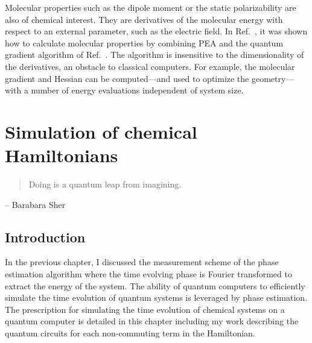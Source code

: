 \documentclass[11pt,oneside,final]{huthesis}%
\begin{document}
Molecular properties such as the dipole moment or the static polarizability are
also of chemical interest. They are derivatives of the molecular energy with
respect to an external parameter, such as the electric field. In Ref.~\cite{Kassal09},
it was shown how to
calculate molecular properties by combining PEA and the quantum gradient
algorithm of Ref.~\cite{Jordan05}. The algorithm is insensitive to the dimensionality
of the derivatives, an obstacle to classical computers. For example, the
molecular gradient and Hessian can be computed---and used to optimize the
geometry---with a number of energy evaluations independent of system size.




\chapter{Simulation of chemical Hamiltonians}\label{chp:qsim}    
\begin{quote}
Doing is a quantum leap from imagining.
\end{quote}
-- Barabara Sher

\section{Introduction}


In the previous chapter, I discussed the measurement scheme of the phase estimation algorithm where the time evolving phase is Fourier transformed to extract the energy of the system.  The ability of quantum computers to efficiently simulate the time evolution of quantum systems is leveraged by phase estimation.  The prescription for simulating the time evolution of chemical systems on a quantum computer is detailed in this chapter including my work describing the quantum circuits for each non-commuting term in the Hamiltonian. %
\end{document}
